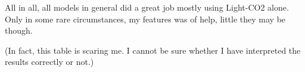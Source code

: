 \documentclass[11pt]{article}
\begin{document}
    All in all, all models in general did a great job mostly using Light-CO2
alone. Only in some rare circumstances, my features was of help, little
they may be though.

(In fact, this table is scaring me. I cannot be sure whether I have
interpreted the results correctly or not.)


    
    
    
    
\end{document}
